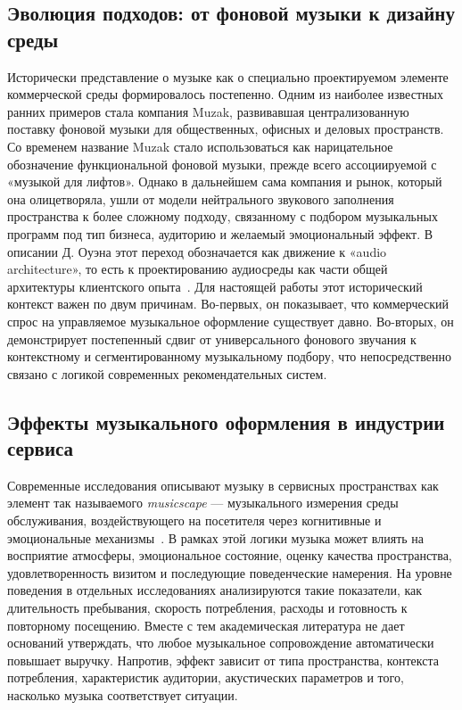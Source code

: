 \subsection{Эволюция подходов: от фоновой музыки к дизайну среды}

Исторически представление о музыке как о специально проектируемом элементе коммерческой среды формировалось постепенно. Одним из наиболее известных ранних примеров стала компания Muzak, развивавшая централизованную поставку фоновой музыки для общественных, офисных и деловых пространств. Со временем название Muzak стало использоваться как нарицательное обозначение функциональной фоновой музыки, прежде всего ассоциируемой с «музыкой для лифтов». Однако в дальнейшем сама компания и рынок, который она олицетворяла, ушли от модели нейтрального звукового заполнения пространства к более сложному подходу, связанному с подбором музыкальных программ под тип бизнеса, аудиторию и желаемый эмоциональный эффект. В описании Д. Оуэна этот переход обозначается как движение к «audio architecture», то есть к проектированию аудиосреды как части общей архитектуры клиентского опыта~\cite{owen2006soundtrack}. Для настоящей работы этот исторический контекст важен по двум причинам. Во-первых, он показывает, что коммерческий спрос на управляемое музыкальное оформление существует давно. Во-вторых, он демонстрирует постепенный сдвиг от универсального фонового звучания к контекстному и сегментированному музыкальному подбору, что непосредственно связано с логикой современных рекомендательных систем.

\subsection{Эффекты музыкального оформления в индустрии сервиса}

Современные исследования описывают музыку в сервисных пространствах как элемент так называемого \textit{musicscape} — музыкального измерения среды обслуживания, воздействующего на посетителя через когнитивные и эмоциональные механизмы~\cite{trompeta2022music}. В рамках этой логики музыка может влиять на восприятие атмосферы, эмоциональное состояние, оценку качества пространства, удовлетворенность визитом и последующие поведенческие намерения. На уровне поведения в отдельных исследованиях анализируются такие показатели, как длительность пребывания, скорость потребления, расходы и готовность к повторному посещению. Вместе с тем академическая литература не дает оснований утверждать, что любое музыкальное сопровождение автоматически повышает выручку. Напротив, эффект зависит от типа пространства, контекста потребления, характеристик аудитории, акустических параметров и того, насколько музыка соответствует ситуации.

